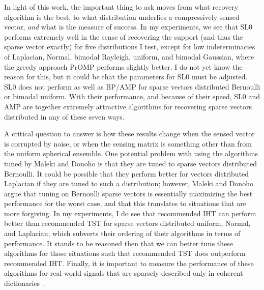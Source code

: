 \documentclass[11pt,draftcls,onecolumn]{IEEEtran}
\begin{document}
In light of this work, 
the important thing to ask moves from
what recovery algorithm is the best,
to what distribution underlies a compressively sensed vector,
{\em and} what is the measure of success.
In my experiments, we see that SL0 performs extremely well 
in the sense of recovering the support (and thus the sparse vector exactly)
for five distributions I test,
except for low indeterminacies of Laplacian, Normal, bimodal Rayleigh, 
uniform, and bimodal Gaussian, where the greedy approach PrOMP performs slightly better.
I do not yet know the reason for this,
but it could be that the parameters for SL0 must be adjusted.
SL0 does not perform as well as BP/AMP for 
sparse vectors distributed Bernoulli or bimodal uniform.
With their performance, and because of their speed, 
SL0 and AMP are together extremely attractive algorithms 
for recovering sparse vectors distributed in any of these seven ways.

A critical question to answer is how these results 
change when the sensed vector is corrupted by noise,
or when the sensing matrix is something other than
from the uniform spherical ensemble.
One potential problem with using the algorithms
tuned by Maleki and Donoho \cite{Maleki2010}
is that they are tuned to sparse vectors distributed Bernoulli.
It could be possible that they perform better for vectors distributed Laplacian
if they are tuned to such a distribution; however,
Maleki and Donoho argue that tuning on Bernoulli sparse vectors
is essentially maximizing the best performance for the worst case,
and that this translates to situations that are more forgiving.
In my experiments, I do see that recommended IHT can perform better
than recommended TST for sparse vectors distributed uniform, 
Normal, and Laplacian,
which subverts their ordering of their algorithms in terms of performance.
It stands to be reasoned then that we can better tune
these algorithms for those situations such that
recommended TST does outperform recommended IHT.
Finally, it is important to measure the performance of these algorithms
for real-world signals that are sparsely described only in 
coherent dictionaries \cite{Candes2010}.



\end{document}
